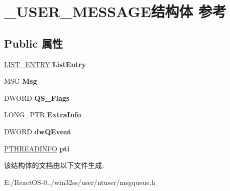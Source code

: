 \hypertarget{struct___u_s_e_r___m_e_s_s_a_g_e}{}\section{\+\_\+\+U\+S\+E\+R\+\_\+\+M\+E\+S\+S\+A\+G\+E结构体 参考}
\label{struct___u_s_e_r___m_e_s_s_a_g_e}
\subsection*{Public 属性}
\begin{DoxyCompactItemize}
\item 
\mbox{\label{struct___u_s_e_r___m_e_s_s_a_g_e_ae2815c8ee5bc660bbf7cd3ae54cd1a1f}} 
\hyperlink{struct___l_i_s_t___e_n_t_r_y}{L\+I\+S\+T\+\_\+\+E\+N\+T\+RY} {\bfseries List\+Entry}
\item 
\mbox{\label{struct___u_s_e_r___m_e_s_s_a_g_e_a73c218f7135c472aaa165d4060a8011f}} 
M\+SG {\bfseries Msg}
\item 
\mbox{\label{struct___u_s_e_r___m_e_s_s_a_g_e_ac2a5f72e55bf6ba25f61bbee8b0cbe5f}} 
D\+W\+O\+RD {\bfseries Q\+S\+\_\+\+Flags}
\item 
\mbox{\label{struct___u_s_e_r___m_e_s_s_a_g_e_ade2fb787c7e42f5b900e26f77496940f}} 
L\+O\+N\+G\+\_\+\+P\+TR {\bfseries Extra\+Info}
\item 
\mbox{\label{struct___u_s_e_r___m_e_s_s_a_g_e_ae56131caef3d6ecc72b1ea6116519ed0}} 
D\+W\+O\+RD {\bfseries dw\+Q\+Event}
\item 
\mbox{\label{struct___u_s_e_r___m_e_s_s_a_g_e_a52ee11f74e7f5a785049a8b3ad54fdc0}} 
\hyperlink{struct___t_h_r_e_a_d_i_n_f_o}{P\+T\+H\+R\+E\+A\+D\+I\+N\+FO} {\bfseries pti}
\end{DoxyCompactItemize}


该结构体的文档由以下文件生成\+:\begin{DoxyCompactItemize}
\item 
E\+:/\+React\+O\+S-\/0../win32ss/user/ntuser/msgqueue.\+h\end{DoxyCompactItemize}
